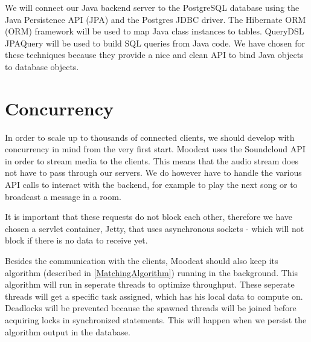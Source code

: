 \par
We will connect our Java backend server to the PostgreSQL database using the Java Persistence API (JPA) and the Postgres JDBC driver.
The Hibernate\cite{HibernateORM} \Gls{ORM} (ORM) framework will be used to map Java class instances to tables.
QueryDSL\cite{QueryDSL} JPAQuery will be used to build \Gls{SQL} queries from Java code.
We have chosen for these techniques because they provide a nice and clean API to bind Java objects to database objects.

\section{Concurrency}
In order to scale up to thousands of connected clients, we should develop with concurrency in mind from the very first start.
Moodcat uses the \gls{Soundcloud} API in order to stream media to the clients.
This means that the audio stream does not have to pass through our servers.
We do however have to handle the various API calls to interact with the backend, for example to play the next song or to broadcast a message in a room.

\par
It is important that these requests do not block each other, therefore we have chosen a servlet container, Jetty, that uses asynchronous sockets - which will not block if there is no data to receive yet.

\par
Besides the communication with the clients, Moodcat should also keep its algorithm (described in \ref{MatchingAlgorithm}) running in the background.
This algorithm will run in seperate threads to optimize throughput.
These seperate threads will get a specific task assigned, which has his local data to compute on.
Deadlocks will be prevented because the spawned threads will be joined before acquiring locks in synchronized statements.
This will happen when we persist the algorithm output in the database.
